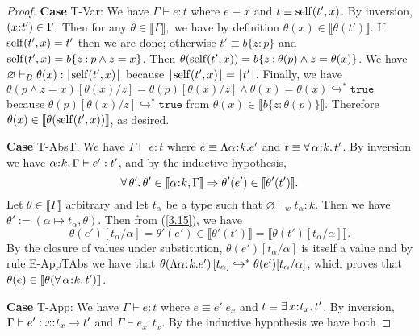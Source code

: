 \documentclass[11pt]{article}
\newcommand{\al}{\alpha}
\newcommand{\bind}{\hspace{0.05em}{:}\hspace{0.05em}} %
\newcommand{\col}{\mathbin{:}}       %
\newcommand{\lb}{\llbracket}         %
\newcommand{\rb}{\rrbracket}         %
\newcommand{\many}{\hookrightarrow^*}
\newcommand{\true}{\mathtt{true}}
\newcommand{\existype}[3]{\exists\, #1\bind #2.\, #3}
\newcommand{\polytype}[3]{\forall\, #1\bind #2.\, #3}
\newcommand{\functype}[3]{#1\bind #2 \rightarrow #3}
\begin{document}
\begin{proof}
{\bf Case} {\sc T-Var}: We have $\Gamma \vdash e : t$ where $e \equiv x$ and $t \equiv {\rm self}(t', x)$. By inversion, $(x\bind t') \in \Gamma$. Then for any $\theta \in \lb\Gamma\rb,$ we have by definition $\theta(x) \in \lb \theta(t')\rb$. If ${\rm self}(t', x) = t'$ then we are done; otherwise $t' \equiv b\{z\col p\}$ and ${\rm self}(t', x) = b\{z \col p \wedge z = x\}$. Then $\theta({\rm self}(t', x)) = b\{z\col \theta(p) \wedge z = \theta(x)\}$. We have $\varnothing\vdash_B \theta(x) : \lfloor {\rm self}(t', x) \rfloor$ because $\lfloor {\rm self}(t', x)\rfloor = \lfloor t'\rfloor$.
Finally, we have $\theta(p\wedge z = x)[\theta(x)/z] 
= \theta(p)[\theta(x)/z] \wedge \theta(x)=\theta(x) \many \true$
because $\theta(p)[\theta(x)/z] \many \true$ from $\theta(x)\in\lb b\{z\col \theta(p)\}\rb.$ Therefore $\theta(x) \in \lb\theta({\rm self}(t',x))\rb$, as desired.


{\bf Case} {\sc T-AbsT}. We have $\Gamma \vdash e : t$ where $e \equiv \Lambda \al\bind k. e'$ and $t \equiv \polytype{\al}{k}{t'}$. By inversion we have $\al\bind k, \Gamma \vdash e' : t'$, and by the inductive hypothesis,
\begin{equation}\label{3.15}
\forall\, \theta'.\, \theta' \in \lb\al\bind k, \Gamma\rb \Rightarrow
\theta'(e') \in \lb\theta'(t')\rb.
\end{equation}
Let $\theta \in \lb\Gamma\rb$ arbitrary and let $t_\al$ be a type such that $\varnothing \vdash_w t_\al : k$. Then we have $\theta' := (\al \mapsto t_\al, \theta).$ Then from (\ref{3.15}), we have \[
\theta(e')[t_\al/\al] = \theta'(e') \in \lb \theta'(t')\rb = \lb\theta(t')[t_\al/\al]\rb.
\]
By the closure of values under substitution, $\theta(e')[t_\al/\al]$ is itself a value and by rule {\sc E-AppTAbs} we have that $\theta(\Lambda \al\bind k. e')\, [t_\al] \many \theta(e')[t_\al/\al]$, which proves that $\theta(e) \in \lb\theta(\polytype{\al}{k}{t'})\rb$.



{\bf Case} {\sc T-App}: We have $\Gamma \vdash e : t$ where $e \equiv e'\; e_x$ and $t \equiv \existype{x}{t_x}{t'}$. By inversion,
$\Gamma \vdash e' : \functype{x}{t_x}{t'}$ and $\Gamma \vdash e_x : t_x$. 
By the inductive hypothesis we have both
                                                                                                                                                                                                                                                                                                                                            

\end{proof}
\end{document}
